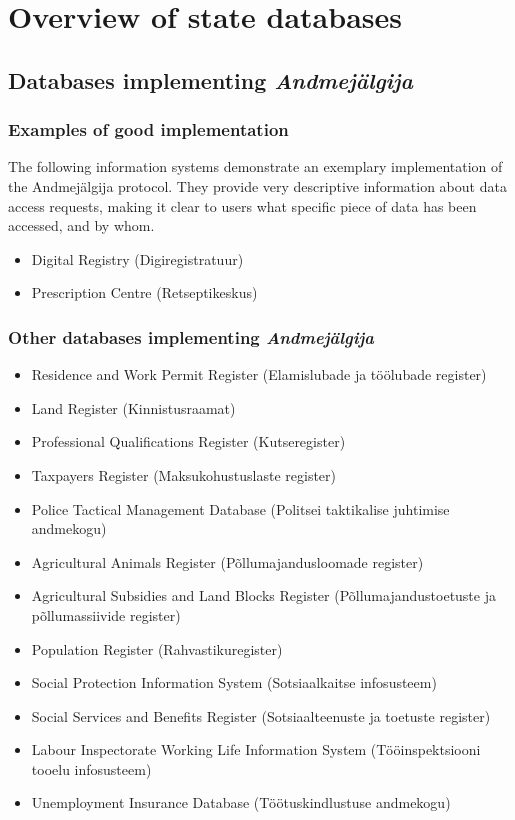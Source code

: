 \section{Overview of state databases} \label{Overview of state databases}

\subsection{Databases implementing \textit{Andmejälgija}}

\subsubsection{Examples of good implementation}
The following information systems demonstrate an exemplary implementation of the Andmejälgija protocol. They provide very descriptive information about data access requests, making it clear to users what specific piece of data has been accessed, and by whom. 

\begin{itemize}
    \item Digital Registry (Digiregistratuur)
    \item Prescription Centre (Retseptikeskus)
\end{itemize}

\subsubsection{Other databases implementing \textit{Andmejälgija}}
\begin{itemize}
    \item Residence and Work Permit Register (Elamislubade ja töölubade register)
    \item Land Register (Kinnistusraamat)
    \item Professional Qualifications Register (Kutseregister)
    \item Taxpayers Register (Maksukohustuslaste register)
    \item Police Tactical Management Database (Politsei taktikalise juhtimise andmekogu)
    \item Agricultural Animals Register (Põllumajandusloomade register)
    \item Agricultural Subsidies and Land Blocks Register (Põllumajandustoetuste ja põllumassiivide register)
    \item Population Register (Rahvastikuregister)
    \item Social Protection Information System (Sotsiaalkaitse infosusteem)
    \item Social Services and Benefits Register (Sotsiaalteenuste ja toetuste register)
    \item Labour Inspectorate Working Life Information System (Tööinspektsiooni tooelu infosusteem)
    \item Unemployment Insurance Database (Töötuskindlustuse andmekogu)
\end{itemize}

